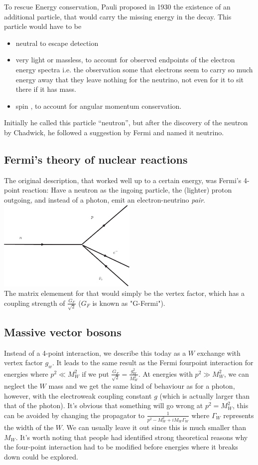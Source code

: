  To rescue Energy conservation, Pauli proposed in 1930 the existence
 of an additional particle, that would carry the missing energy in the
 decay. This particle would have to be
\begin{itemize}
 \item neutral to escape detection
 \item very light or massless, to account for observed endpoints of
 the electron energy spectra i.e. the observation some that electrons
 seem to carry so much energy away that they leave nothing for the
 neutrino, not even for it to sit there if it has mass.
 \item spin \half, to account for angular momentum conservation.
\end{itemize}
 Initially he called this particle ``neutron'', but after the
 discovery of the neutron by Chadwick, he followed a suggestion by
 Fermi and named it neutrino.

\subsection{Fermi's theory of nuclear reactions}

 The original description, that worked well up to a certain energy, was Fermi's 4-point reaction: Have a
 neutron as the ingoing particle, the (lighter) proton outgoing, and
 instead of a photon, emit an electron-neutrino \emph{pair}.
\\
\includegraphics[width=0.5\textwidth]{fig/weak/fourPoing}
\\
The matrix elemement for that would simply be the vertex factor, which has a coupling strength of $\frac{G_F}{\sqrt{2}}$ ($G_F$ is known as "G-Fermi").

\subsection{Massive vector bosons}
Instead of a 4-point interaction, we describe this today as a $W$ exchange with vertex factor $g_w$. It leads to the same result as the Fermi fourpoint interaction for energies where $p^2 \ll M_W^2$ if we put $\frac{G_F}{\sqrt{2}} = \frac{g_W^2}{M_W^2}$. At energies with $p^2 \gg M_W^2$, we can neglect the $W$ mass and we get the same kind of behaviour as for a photon, however, with the electroweak coupling constant $g$ (which is actually larger than that of the photon). It's obvious that something will go wrong at $p^2 = M_W^2$, this can be avoided by changing the propagator to $\frac{1}{p^2 - M_W^2 + iM_W\Gamma_W}$ where $\Gamma_W$ represents the width of the $W$. We can usually leave it out since this is much smaller than $M_W$.
It's worth noting that people had identified strong theoretical reasons why the four-point interaction had to be modified before energies where it breaks down could be explored. 


